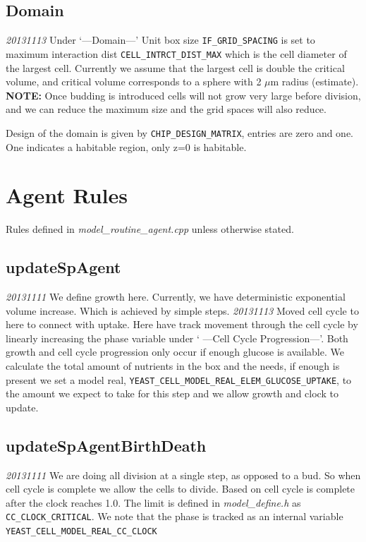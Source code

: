 \documentclass{article}
\begin{document}
\subsection{Domain}
\emph{20131113} Under `---Domain---'
Unit box size \texttt{IF\_GRID\_SPACING} is set to maximum interaction dist 
\texttt{CELL\_INTRCT\_DIST\_MAX} which is the cell diameter of the largest cell.
Currently we assume that the largest cell is double the critical volume,
and critical volume corresponds to a sphere with 2 $\mu$m radius (estimate).
\textbf{NOTE:} Once budding is introduced cells will not grow very large before division,
and we can reduce the maximum size and the grid spaces will also reduce.

Design of the domain is given by \texttt{CHIP\_DESIGN\_MATRIX}, 
entries are zero and one.
One indicates a habitable region, only z=0 is habitable.





\section{Agent Rules}
Rules defined in \textit{model\_routine\_agent.cpp} unless otherwise stated.

\subsection{updateSpAgent}
\emph{20131111} We define growth here.  
Currently, we have deterministic exponential volume increase.
Which is achieved by simple steps.  
\emph{20131113} Moved cell cycle to here to connect with uptake.
Here have track movement through the cell cycle by linearly increasing the phase variable under ` ---Cell Cycle Progression---'.
Both growth and cell cycle progression only occur if enough glucose is available.
We calculate the total amount of nutrients in the box and the needs,
if enough is present we set a model real, \texttt{YEAST\_CELL\_MODEL\_REAL\_ELEM\_GLUCOSE\_UPTAKE},
to the amount we expect to take for this step and we allow growth and clock to update.



\subsection{updateSpAgentBirthDeath }
\emph{20131111} We are doing all division at a single step,
as opposed to a bud.
So when cell cycle is complete we allow the cells to divide.
Based on \cite{Charvin2009} cell cycle is complete after the clock reaches 1.0.
The limit is defined in \textit{model\_define.h} as \texttt{CC\_CLOCK\_CRITICAL}.
We note that the phase is tracked as an internal variable \texttt{YEAST\_CELL\_MODEL\_REAL\_CC\_CLOCK}
\end{document}
